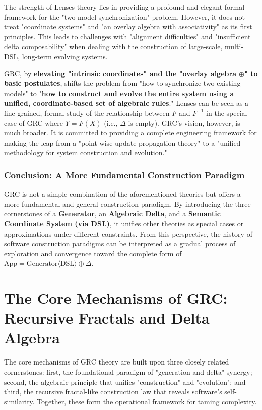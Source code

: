 \documentclass[11pt]{article}
\begin{document}
The strength of Lenses theory lies in providing a profound and elegant formal framework for the "two-model synchronization" problem. However, it does not treat "coordinate systems" and "an overlay algebra with associativity" as its first principles. This leads to challenges with "alignment difficulties" and "insufficient delta composability" when dealing with the construction of large-scale, multi-DSL, long-term evolving systems.

GRC, by \textbf{elevating "intrinsic coordinates" and the "overlay algebra $\oplus$" to basic postulates}, shifts the problem from "how to synchronize two existing models" to "\textbf{how to construct and evolve the entire system using a unified, coordinate-based set of algebraic rules}." Lenses can be seen as a fine-grained, formal study of the relationship between $F$ and $F^{-1}$ in the special case of GRC where $Y = F(X)$ (i.e., $\Delta$ is empty). GRC's vision, however, is much broader. It is committed to providing a complete engineering framework for making the leap from a "point-wise update propagation theory" to a "unified methodology for system construction and evolution."

\subsubsection{Conclusion: A More Fundamental Construction Paradigm}

GRC is not a simple combination of the aforementioned theories but offers a more fundamental and general construction paradigm. By introducing the three cornerstones of a \textbf{Generator}, an \textbf{Algebraic Delta}, and a \textbf{Semantic Coordinate System (via DSL)}, it unifies other theories as special cases or approximations under different constraints. From this perspective, the history of software construction paradigms can be interpreted as a gradual process of exploration and convergence toward the complete form of $\text{App} = \text{Generator}\langle\text{DSL}\rangle \oplus \Delta$.

\section{The Core Mechanisms of GRC: Recursive Fractals and Delta Algebra}

The core mechanisms of GRC theory are built upon three closely related cornerstones: first, the foundational paradigm of "generation and delta" synergy; second, the algebraic principle that unifies "construction" and "evolution"; and third, the recursive fractal-like construction law that reveals software's self-similarity. Together, these form the operational framework for taming complexity.
\end{document}
